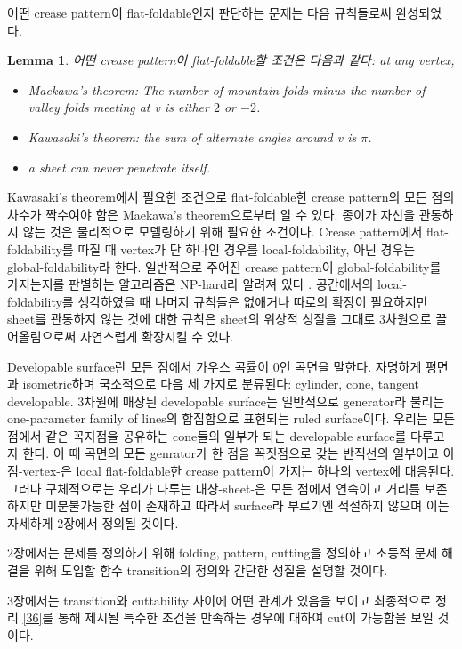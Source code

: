 \documentclass{amsart}
\theoremstyle{plain}
\newtheorem{lemma}[theorem]{Lemma}
\theoremstyle{definition}
\theoremstyle{remark}
\begin{document}
어떤 crease pattern이 flat-foldable인지 판단하는 문제는 다음 규칙들로써 완성되었다.

\begin{lemma}
어떤 crease pattern이 flat-foldable할 조건은 다음과 같다: at any vertex,
\begin{itemize}
\item {\rm Maekawa's theorem:} The number of mountain folds minus the number of valley folds meeting at v is either $2$ or $−2$.
\item {\rm Kawasaki's theorem:} the sum of alternate angles around v is $\pi$.
\item a sheet can never penetrate itself.
\end{itemize}
\end{lemma}

Kawasaki's theorem에서 필요한 조건으로 flat-foldable한 crease pattern의 모든 점의 차수가 짝수여야 함은 Maekawa's theorem으로부터 알 수 있다.
종이가 자신을 관통하지 않는 것은 물리적으로 모델링하기 위해 필요한 조건이다.
Crease pattern에서 flat-foldability를 따질 때 vertex가 단 하나인 경우를 local-foldability, 아닌 경우는 global-foldability라 한다.
일반적으로 주어진 crease pattern이 global-foldability를 가지는지를 판별하는 알고리즘은 NP-hard라 알려져 있다 \cite{Be}.
공간에서의 local-foldability를 생각하였을 때 나머지 규칙들은 없애거나 따로의 확장이 필요하지만 sheet를 관통하지 않는 것에 대한 규칙은 sheet의 위상적 성질을 그대로 3차원으로 끌어올림으로써 자연스럽게 확장시킬 수 있다.


Developable surface란 모든 점에서 가우스 곡률이 0인 곡면을 말한다. 자명하게 평면과 isometric하며 국소적으로 다음 세 가지로 분류된다: cylinder, cone, tangent developable.
3차원에 매장된 developable surface는 일반적으로 generator라 불리는 one-parameter family of lines의 합집합으로 표현되는 ruled surface이다.
우리는 모든 점에서 같은 꼭지점을 공유하는 cone들의 일부가 되는 developable surface를 다루고자 한다.
이 때 곡면의 모든 genrator가 한 점을 꼭짓점으로 갖는 반직선의 일부이고 이 점-vertex-은 local flat-foldable한 crease pattern이 가지는 하나의 vertex에 대응된다.
그러나 구체적으로는 우리가 다루는 대상-sheet-은 모든 점에서 연속이고 거리를 보존하지만 미분불가능한 점이 존재하고 따라서 surface라 부르기엔 적절하지 않으며 이는 자세하게 2장에서 정의될 것이다.


2장에서는 문제를 정의하기 위해 folding, pattern, cutting을 정의하고 초등적 문제 해결을 위해 도입할 함수 transition의 정의와 간단한 성질을 설명할 것이다.

3장에서는 transition와 cuttability 사이에 어떤 관계가 있음을 보이고 최종적으로 정리 \ref{36}를 통해 제시될 특수한 조건을 만족하는 경우에 대하여 cut이 가능함을 보일 것이다.
\end{document}
